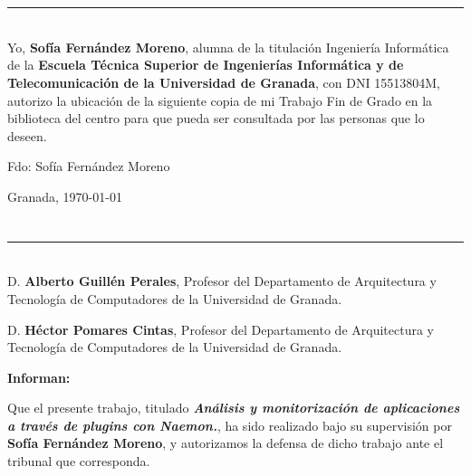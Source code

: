 \chapter*{}
\thispagestyle{empty}

\noindent\rule[-1ex]{\textwidth}{2pt}\\[4.5ex]

Yo, \textbf{Sofía Fernández Moreno}, alumna de la titulación Ingeniería Informática de la \textbf{Escuela Técnica Superior de Ingenierías Informática y de Telecomunicación de la Universidad de Granada}, con DNI 15513804M, autorizo la ubicación de la siguiente copia de mi Trabajo Fin de Grado en la biblioteca del centro para que pueda ser consultada por las personas que lo deseen.

\vspace{6cm}

\noindent Fdo: Sofía Fernández Moreno

\vspace{2cm}

\begin{flushright}
Granada, \today
\end{flushright}


\chapter*{}
\thispagestyle{empty}

\noindent\rule[-1ex]{\textwidth}{2pt}\\[4.5ex]

D. \textbf{Alberto Guillén Perales}, Profesor del Departamento de Arquitectura y Tecnología de Computadores de la Universidad de Granada.

\vspace{0.5cm}

D. \textbf{Héctor Pomares Cintas}, Profesor del Departamento de Arquitectura y Tecnología de Computadores de la Universidad de Granada.


\vspace{0.5cm}

\textbf{Informan:}

\vspace{0.5cm}

Que el presente trabajo, titulado \textit{\textbf{Análisis y monitorización de aplicaciones a través de plugins con Naemon.}}, ha sido realizado bajo su supervisión por \textbf{Sofía Fernández Moreno}, y autorizamos la defensa de dicho trabajo ante el tribunal que corresponda.

